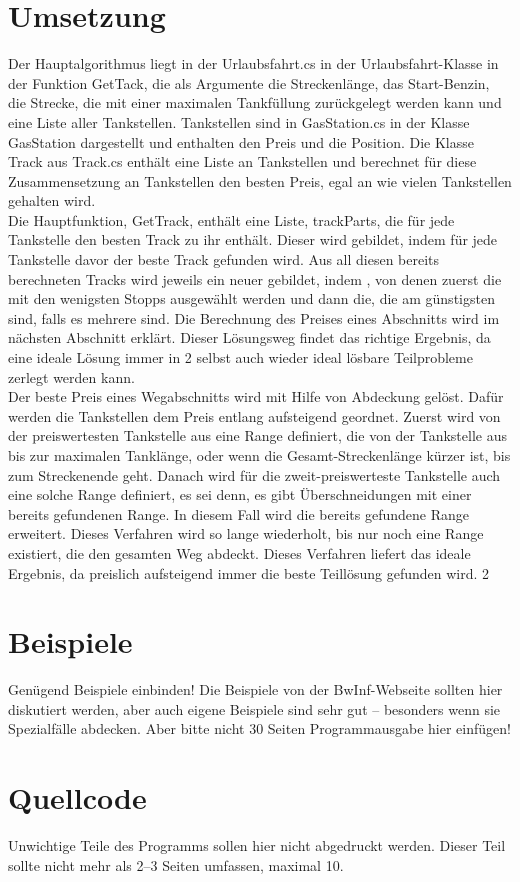 \documentclass[a4paper,10pt,ngerman]{scrartcl}
\begin{document}
\section{Umsetzung}
Der Hauptalgorithmus liegt in der Urlaubsfahrt.cs in der Urlaubsfahrt-Klasse in der Funktion GetTack, die als Argumente die Streckenlänge, das Start-Benzin, die Strecke, die mit einer maximalen Tankfüllung zurückgelegt werden kann und eine Liste aller Tankstellen. Tankstellen sind in GasStation.cs in der Klasse GasStation dargestellt und enthalten den Preis und die Position. Die Klasse Track aus Track.cs  enthält eine Liste an Tankstellen und berechnet für diese Zusammensetzung an Tankstellen den besten Preis, egal an wie vielen Tankstellen gehalten wird. \\
Die Hauptfunktion, GetTrack, enthält eine Liste, trackParts, die für jede Tankstelle den besten Track zu ihr enthält. Dieser wird gebildet, indem für jede Tankstelle davor der beste Track gefunden wird. Aus all diesen bereits berechneten Tracks wird jeweils ein neuer gebildet, indem , von denen zuerst die mit den wenigsten Stopps ausgewählt werden und dann die, die am günstigsten sind, falls es mehrere sind. Die Berechnung des Preises eines Abschnitts wird im nächsten Abschnitt erklärt. Dieser Lösungsweg findet das richtige Ergebnis, da eine ideale Lösung immer in 2 selbst auch wieder ideal lösbare Teilprobleme zerlegt werden kann. \\
Der beste Preis eines Wegabschnitts wird mit Hilfe von Abdeckung gelöst. Dafür werden die Tankstellen dem Preis entlang aufsteigend geordnet. Zuerst wird von der preiswertesten Tankstelle aus eine Range definiert, die von der Tankstelle aus bis zur maximalen Tanklänge, oder wenn die Gesamt-Streckenlänge kürzer ist, bis zum Streckenende geht. Danach wird für die zweit-preiswerteste Tankstelle auch eine solche Range definiert, es sei denn, es gibt Überschneidungen mit einer bereits gefundenen Range. In diesem Fall wird die bereits gefundene Range erweitert. Dieses Verfahren wird so lange wiederholt, bis nur noch eine Range existiert, die den gesamten Weg abdeckt. Dieses Verfahren liefert das ideale Ergebnis, da preislich aufsteigend immer die beste Teillösung gefunden wird. 
2
\section{Beispiele}
Genügend Beispiele einbinden! Die Beispiele von der BwInf-Webseite sollten hier diskutiert werden, aber auch eigene Beispiele sind sehr gut – besonders wenn sie Spezialfälle abdecken. Aber bitte nicht 30 Seiten Programmausgabe hier einfügen!

\section{Quellcode}
Unwichtige Teile des Programms sollen hier nicht abgedruckt werden. Dieser Teil sollte nicht mehr als 2–3 Seiten umfassen, maximal 10.
\end{document}
